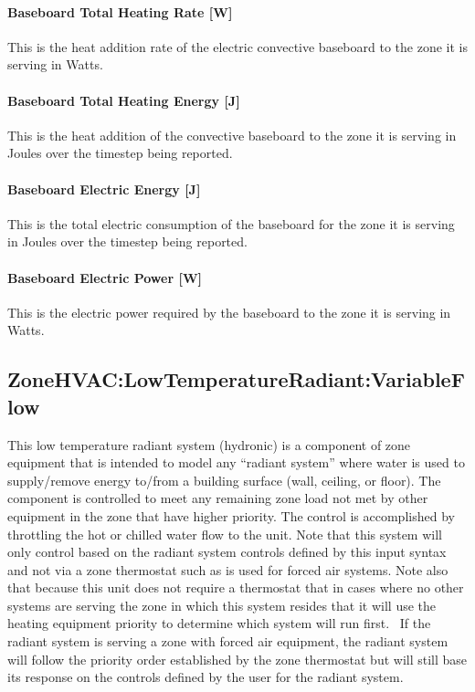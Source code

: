 \paragraph{Baseboard Total Heating Rate {[}W{]}}\label{baseboard-total-heating-rate-w-4}

This is the heat addition rate of the electric convective baseboard to the zone it is serving in Watts.

\paragraph{Baseboard Total Heating Energy {[}J{]}}\label{baseboard-total-heating-energy-j-4}

This is the heat addition of the convective baseboard to the zone it is serving in Joules over the timestep being reported.

\paragraph{Baseboard Electric Energy {[}J{]}}\label{baseboard-electric-energy-j-1}

This is the total electric consumption of the baseboard for the zone it is serving in Joules over the timestep being reported.

\paragraph{Baseboard Electric Power {[}W{]}}\label{baseboard-electric-power-w-000}

This is the electric power required by the baseboard to the zone it is serving in Watts.

\subsection{ZoneHVAC:LowTemperatureRadiant:VariableFlow}\label{zonehvaclowtemperatureradiantvariableflow}

This low temperature radiant system (hydronic) is a component of zone equipment that is intended to model any ``radiant system'' where water is used to supply/remove energy to/from a building surface (wall, ceiling, or floor). The component is controlled to meet any remaining zone load not met by other equipment in the zone that have higher priority. The control is accomplished by throttling the hot or chilled water flow to the unit. Note that this system will only control based on the radiant system controls defined by this input syntax and not via a zone thermostat such as is used for forced air systems. Note also that because this unit does not require a thermostat that in cases where no other systems are serving the zone in which this system resides that it will use the heating equipment priority to determine which system will run first.~ If the radiant system is serving a zone with forced air equipment, the radiant system will follow the priority order established by the zone thermostat but will still base its response on the controls defined by the user for the radiant system.

